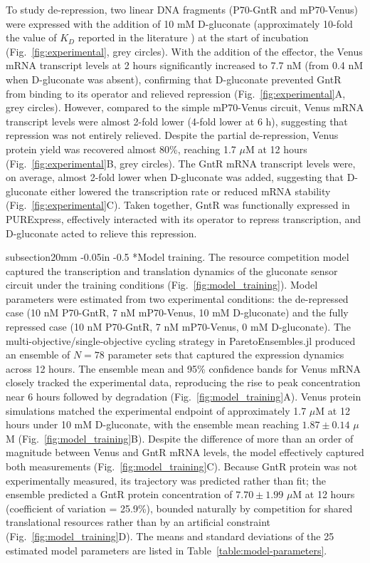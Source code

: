 \documentclass[12pt]{article}
\makeatletter
\renewcommand\subsection{\@startsection
	{subsection}{2}{0mm}
	{-0.05in}
	{-0.5\baselineskip}
	{\normalfont\normalsize\bfseries}}
\makeatother
\begin{document}
To study de-repression, two linear DNA fragments (P70-GntR and mP70-Venus) were expressed with the addition of 10 mM D-gluconate (approximately 10-fold the value of $K_D$ reported in the literature \cite{daddaoua2017identification}) at the start of incubation (Fig.~\ref{fig:experimental}, grey circles). With the addition of the effector, the Venus mRNA transcript levels at 2 hours significantly increased to 7.7 nM (from 0.4 nM when D-gluconate was absent), confirming that D-gluconate prevented GntR from binding to its operator and relieved repression (Fig.~\ref{fig:experimental}A, grey circles). However, compared to the simple mP70-Venus circuit, Venus mRNA transcript levels were almost 2-fold lower (4-fold lower at 6 h), suggesting that repression was not entirely relieved. Despite the partial de-repression, Venus protein yield was recovered almost 80\%, reaching 1.7 $\mu$M at 12 hours (Fig.~\ref{fig:experimental}B, grey circles). The GntR mRNA transcript levels were, on average, almost 2-fold lower when D-gluconate was added, suggesting that D-gluconate either lowered the transcription rate or reduced mRNA stability (Fig.~\ref{fig:experimental}C). Taken together, GntR was functionally expressed in PURExpress, effectively interacted with its operator to repress transcription, and D-gluconate acted to relieve this repression.

\subsection*{Model training.}
The resource competition model captured the transcription and translation dynamics of the gluconate sensor circuit under the training conditions (Fig.~\ref{fig:model_training}). Model parameters were estimated from two experimental conditions: the de-repressed case (10 nM P70-GntR, 7 nM mP70-Venus, 10 mM D-gluconate) and the fully repressed case (10 nM P70-GntR, 7 nM mP70-Venus, 0 mM D-gluconate). The multi-objective/single-objective cycling strategy in ParetoEnsembles.jl produced an ensemble of $N = 78$ parameter sets that captured the expression dynamics across 12 hours. The ensemble mean and 95\% confidence bands for Venus mRNA closely tracked the experimental data, reproducing the rise to peak concentration near 6 hours followed by degradation (Fig.~\ref{fig:model_training}A). Venus protein simulations matched the experimental endpoint of approximately 1.7 $\mu$M at 12 hours under 10 mM D-gluconate, with the ensemble mean reaching $1.87 \pm 0.14$ $\mu$M (Fig.~\ref{fig:model_training}B). Despite the difference of more than an order of magnitude between Venus and GntR mRNA levels, the model effectively captured both measurements (Fig.~\ref{fig:model_training}C). Because GntR protein was not experimentally measured, its trajectory was predicted rather than fit; the ensemble predicted a GntR protein concentration of $7.70 \pm 1.99$ $\mu$M at 12 hours (coefficient of variation = 25.9\%), bounded naturally by competition for shared translational resources rather than by an artificial constraint (Fig.~\ref{fig:model_training}D). The means and standard deviations of the 25 estimated model parameters are listed in Table~\ref{table:model-parameters}.
\end{document}
